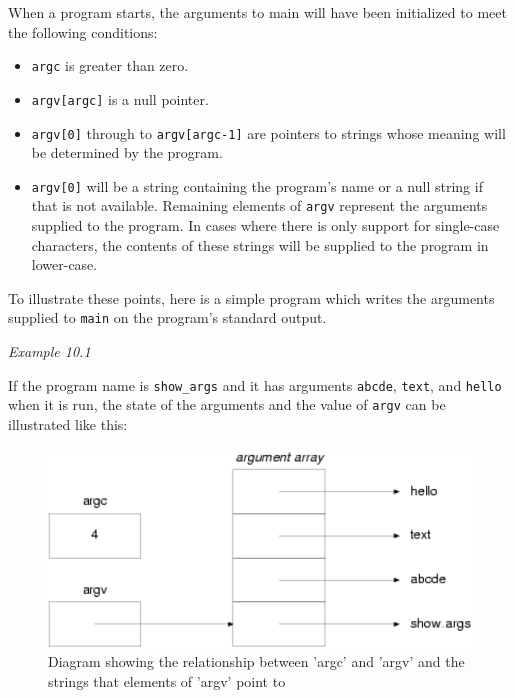   When a program starts, the arguments to main will have been initialized
   to meet the following conditions:


  \begin{itemize}
   \item \texttt{argc} is greater than zero.

   \item \texttt{argv[argc]} is a null pointer.

   \item \texttt{argv[0]} through to \texttt{argv[argc-1]} are
    pointers to strings whose meaning will be determined by the
    program.

   \item \texttt{argv[0]} will be a string containing the program's name
    or a null string if that is not available. Remaining elements of
    \texttt{argv} represent the arguments supplied to the program. In
    cases where there is only support for single-case characters, the
    contents of these strings will be supplied to the program in
    lower-case.
  \end{itemize}

  To illustrate these points, here is a simple program which writes the
   arguments supplied to \texttt{main} on the program's standard
   output.


  \begin{center}\textit{Example 10.1}\end{center}


  If the program name is \texttt{show\_args} and it has arguments
   \texttt{abcde}, \texttt{text}, and \texttt{hello} when it is
   run, the state of the arguments and the value of \texttt{argv} can be
   illustrated like this:


  \begin{figure}\centering\includegraphics[type=pdf,read=.pdf,ext=.pdf,scale=1.0]{figure/10.1}\caption{Diagram showing the relationship between 'argc' and 'argv'                and the strings that elements of 'argv' point to}\end{figure}

